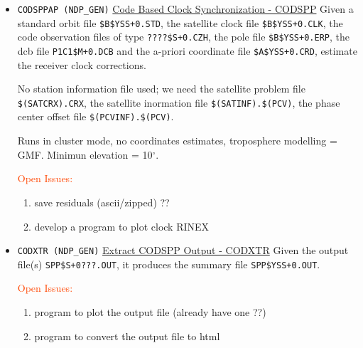 \begin{itemize}
  \item \texttt{CODSPPAP (NDP\_GEN)} \underline{Code Based Clock Synchronization - CODSPP}
    Given a standard orbit file \texttt{\$B\$YSS+0.STD}, the satellite clock file
    \texttt{\$B\$YSS+0.CLK}, the code observation files of type \texttt{????\$S+0.CZH},
    the pole file \texttt{\$B\$YSS+0.ERP}, the dcb file \texttt{P1C1\$M+0.DCB} and
    the a-priori coordinate file \texttt{\$A\$YSS+0.CRD}, estimate the receiver
    clock corrections.

    No station information file used; we need  the satellite problem file 
    \texttt{\$(SATCRX).CRX}, the satellite inormation file \texttt{\$(SATINF).\$(PCV)},
    the phase center offset file \texttt{\$(PCVINF).\$(PCV)}.

    Runs in cluster mode, no coordinates estimates, troposphere modelling = GMF.
    Minimun elevation = 10$^{\circ}$.
    
    \textcolor{OrangeRed}{Open Issues:}
    \begin{enumerate}
      \item save residuals (ascii/zipped) ??
      \item develop a program to plot clock RINEX
    \end{enumerate}

  \item \texttt{CODXTR (NDP\_GEN)} \underline{Extract CODSPP Output - CODXTR}
    Given the output file(s) \texttt{SPP\$S+0???.OUT}, it produces the summary
    file \texttt{SPP\$YSS+0.OUT}.

    \textcolor{OrangeRed}{Open Issues:}
    \begin{enumerate}
      \item program to plot the output file (already have one ??)
      \item program to convert the output file to html
    \end{enumerate}

\end{itemize}
